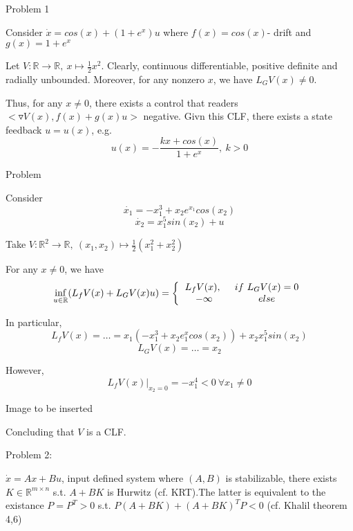 Problem 1

Consider $\dot{x} = cos(x) + (1+e^x)u$ where $f(x) = cos(x)$- drift and $g(x) = 1+e^x$

Let $V: \mathbb{R} \to \mathbb{R}, \ x \mapsto \frac{1}{2}x^2$. Clearly, continuous differentiable, positive definite and radially unbounded. Moreover, for any nonzero $x$, we have $L_GV(x) \neq 0$. 

Thus, for any $x \neq 0$, there exists a control that readers $<\triangledown V(x), f(x) + g(x)u>$ negative. 
Givn this CLF, there exists a state feedback $u = u(x)$, e.g. 
\begin{equation*}
u(x) = - \frac{kx+cos(x)}{1+e^x}, \ k > 0
\end{equation*}

Problem

Consider 
\begin{equation*}
\dot{x_1} = -x_1^3 + x_2e^{x_1}cos(x_2)
\end{equation*}  
\begin{equation*}
\dot{x_2} = x_1^5sin(x_2) + u
\end{equation*}

Take $V: \mathbb{R}^2 \to \mathbb{R}, \ (x_1, x_2) \mapsto \frac{1}{2}(x_1^2 + x_2^2)$

For any $x \neq 0$, we have 
\begin{equation*}
\inf_{u \in \mathbb{R}}(L_fV(x) + L_GV(x)u) = 
\left \{ 
\begin{tabular}{cc} 
$L_fV(x), \ $ & $if\ L_GV(x) = 0$ \\ 
$- \infty$ & $else$ 
\end{tabular} 
\right.
\end{equation*}

In particular,
\begin{equation*}
L_fV(x) = \dots = x_1(-x_1^3 + x_2e^x_1 cos(x_2)) + x_2x_1^5sin(x_2)
\end{equation*}
\begin{equation*}
L_GV(x) = \dots = x_2
\end{equation*}

However, 
\begin{equation*}
L_fV(x)|_{x_2 = 0} = -x_1^4 < 0 \ \forall x_1 \neq 0
\end{equation*}

Image to be inserted

Concluding that $V$ is a CLF.

Problem 2:

$\dot{x} = Ax + Bu$, input defined system where $(A,B)$ is stabilizable, there exists $K \in \mathbb{R}^{m \times n}$ s.t. $A+BK$ is Hurwitz (cf. KRT).The latter is equivalent to the existance $P = P^T > 0$ s.t. $P(A+BK) + (A+BK)^TP < 0$ (cf. Khalil theorem 4,6)

